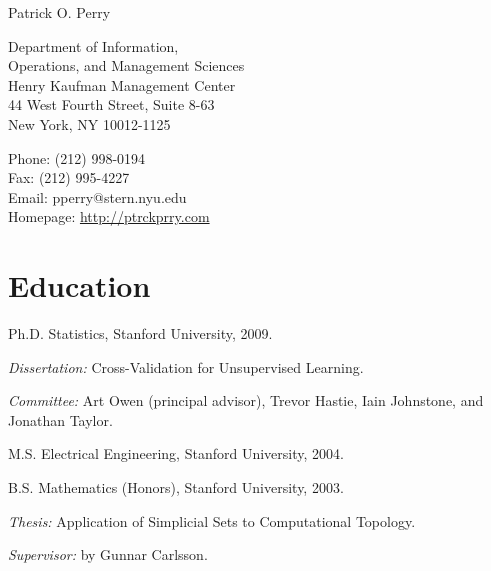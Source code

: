 \documentclass[10pt,letterpaper]{article}
\def\name{Patrick O. Perry}
\renewenvironment{itemize}{
  \begin{list}{}{
    \setlength{\leftmargin}{1.5em}
    \setlength{\itemsep}{0.25em}
    \setlength{\parskip}{0pt}
    \setlength{\parsep}{0.25em}
  }
}{
  \end{list}
}
\begin{document}
\nobibliography*

{\huge \name}


\bigskip

\begin{minipage}[t]{0.5\textwidth}
  Department of Information, \\
  Operations, and Management Sciences \\
  Henry Kaufman Management Center \\
  44 West Fourth Street, Suite 8-63 \\
  New York, NY 10012-1125
\end{minipage}
\begin{minipage}[t]{0.5\textwidth}
  Phone: (212) 998-0194 \\
  Fax: (212) 995-4227 \\
  Email: pperry@stern.nyu.edu \\
  Homepage: \href{http://ptrckprry.com/}{http://ptrckprry.com}
\end{minipage}

%

\section*{Education}

\begin{itemize}
  \item Ph.D. Statistics, Stanford University, 2009.
    \begin{itemize}
    \item \textit{Dissertation:}
      Cross-Validation for Unsupervised Learning.
    \item \textit{Committee:}
      Art Owen (principal advisor), Trevor Hastie,
      Iain Johnstone, and Jonathan Taylor.
    \end{itemize}
  \item M.S. Electrical Engineering, Stanford University, 2004.
  \item B.S. Mathematics (Honors),
    Stanford University, 2003.
    \begin{itemize}
    \item \textit{Thesis:}
      Application of Simplicial Sets to Computational Topology.
    \item \textit{Supervisor:} by Gunnar Carlsson.
    \end{itemize}
\end{itemize}
\end{document}
